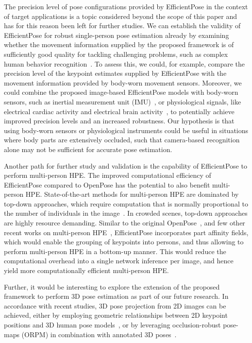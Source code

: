 The precision level of pose configurations provided by EfficientPose in the context of target applications is a topic considered beyond the scope of this paper and has for this reason been left for further studies. We can establish the validity of EfficientPose for robust single-person pose estimation already by examining whether the movement information supplied by the proposed framework is of sufficiently good quality for tackling challenging problems, such as complex human behavior recognition~\cite{liu2018learning, fernando2018tracking}. To assess this, we could, for example, compare the precision level of the keypoint estimates supplied by EfficientPose with the movement information provided by body-worn movement sensors. Moreover, we could combine the proposed image-based EfficientPose models with body-worn sensors, such as inertial measurement unit (IMU)~\cite{kundu2018hand}, or physiological signals, like electrical cardiac activity and electrical brain activity~\cite{fiorini2020unsupervised}, to potentially achieve improved precision levels and an increased robustness. Our hypothesis is that using body-worn sensors or physiological instruments could be useful in situations where body parts are extensively occluded, such that camera-based recognition alone may not be sufficient for accurate pose estimation.

Another path for further study and validation is the capability of EfficientPose to perform multi-person HPE. The improved computational efficiency of EfficientPose compared to OpenPose has the potential to also benefit multi-person HPE. State-of-the-art methods for multi-person HPE are dominated by top-down approaches, which require computation that is normally proportional to the number of individuals in the image~\cite{fieraru2018learning, zhang2019distribution}. In crowded scenes, top-down approaches are highly resource demanding. Similar to the original OpenPose~\cite{cao2018openpose}, and few other recent works on multi-person HPE~\cite{huang2020high, guan2019realtime}, EfficientPose incorporates part affinity fields, which would enable the grouping of keypoints into persons, and thus allowing to perform multi-person HPE in a bottom-up manner. This would reduce the computational overhead into a single network inference per image, and hence yield more computationally efficient multi-person HPE.

Further, it would be interesting to explore the extension of the proposed framework to perform 3D pose estimation as part of our future research. In accordance with recent studies, 3D pose projection from 2D images can be achieved, either by employing geometric relationships between 2D keypoint positions and 3D human pose models~\cite{yuan2020single}, or by leveraging occlusion-robust pose-maps (ORPM) in combination with annotated 3D poses~\cite{mehta2018single, benzine2020single}.


